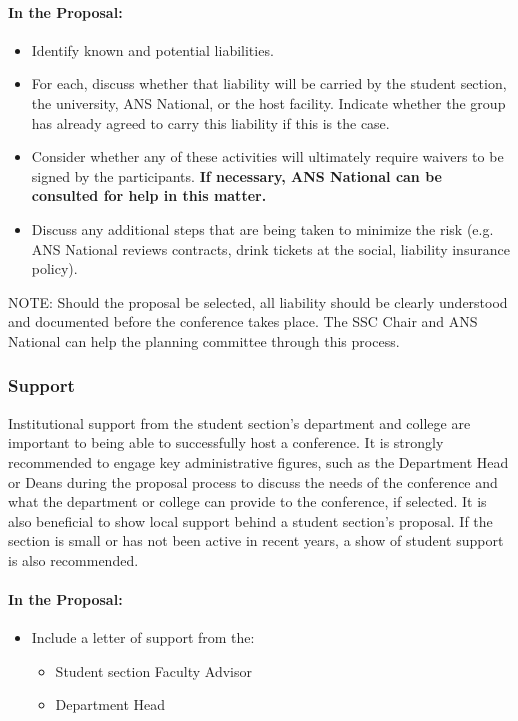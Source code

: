 \documentclass[12pt]{article}
\begin{document}
\paragraph{In the Proposal:}
\begin{itemize}
\item{Identify known and potential liabilities.}
\item{For each, discuss whether that liability will be carried by the student section, the university, ANS National, or the host facility. Indicate whether the group has already agreed to carry this liability if this is the case.}
\item{Consider whether any of these activities will ultimately require waivers to be signed by the participants. \textbf{If necessary, ANS National can be consulted for help in this matter.}}
\item{Discuss any additional steps that are being taken to minimize the risk (e.g. ANS National reviews contracts, drink tickets at the social, liability insurance policy).}
\end{itemize}

NOTE: Should the proposal be selected, all liability should be clearly understood and documented before the conference takes place. The SSC Chair and ANS National can help the planning committee through this process.

\subsubsection{Support}
Institutional support from the student section's department and college are important to being able to successfully host a conference.
It is strongly recommended to engage key administrative figures, such as the Department Head or Deans during the proposal process to discuss the needs of the conference and what the department or college can provide to the conference, if selected.
It is also beneficial to show local support behind a student section’s proposal.
If the section is small or has not been active in recent years, a show of student support is also
recommended.

\paragraph{In the Proposal:}
\begin{itemize}
\item Include a letter of support from the:
\begin{itemize}
\item{Student section Faculty Advisor}
\item{Department Head}
\end{itemize}
\end{itemize}
\end{document}
